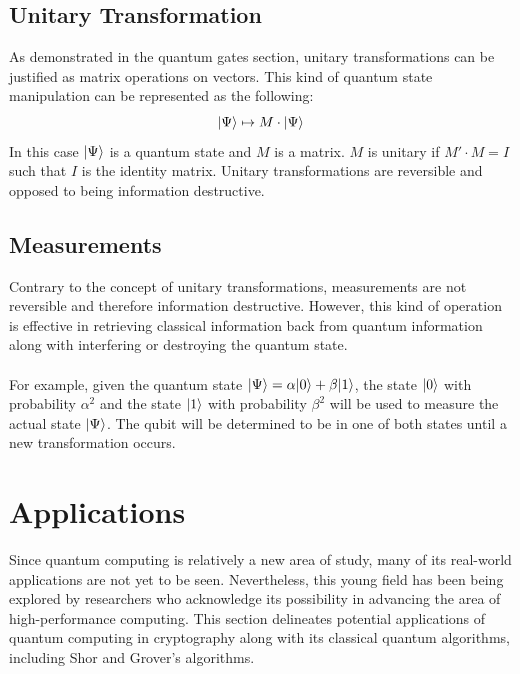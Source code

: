\documentclass[12pt]{third-rep}
\begin{document}
\section{Unitary Transformation}
As demonstrated in the quantum gates section, unitary transformations can be justified as matrix operations on vectors. This kind of quantum state manipulation can be represented as the following:
$${\left\vert{\Psi}\right\rangle}\mapsto M\cdot{\left\vert{\Psi}\right\rangle}$$
In this case ${\left\vert{\Psi}\right\rangle}$ is a quantum state and $M$ is a matrix. $M$ is unitary if $M'\cdot M=I$ such that $I$ is the identity matrix. Unitary transformations are reversible and opposed to being information destructive.

\section{Measurements}
Contrary to the concept of unitary transformations, measurements are not reversible and therefore information destructive. However, this kind of operation is effective in retrieving classical information back from quantum information along with interfering or destroying the quantum state. \\\\
For example, given the quantum state ${\left\vert{\Psi}\right\rangle}=\alpha{\left\vert{0}\right\rangle}+\beta{\left\vert{1}\right\rangle}$, the state ${\left\vert{0}\right\rangle}$ with probability $\alpha^2$ and the state ${\left\vert{1}\right\rangle}$ with probability $\beta^2$ will be used to measure the actual state ${\left\vert{\Psi}\right\rangle}$. The qubit will be determined to be in one of both states until a new transformation occurs. 

\begingroup
\renewcommand{\cleardoublepage}{}
\renewcommand{\clearpage}{}
\chapter{Applications}
\endgroup

Since quantum computing is relatively a new area of study, many of its real-world applications are not yet to be seen. Nevertheless, this young field has been being explored by researchers who acknowledge its possibility in advancing the area of high-performance computing. This section delineates potential applications of quantum computing in cryptography along with its classical quantum algorithms, including Shor and Grover's algorithms.
\end{document}

